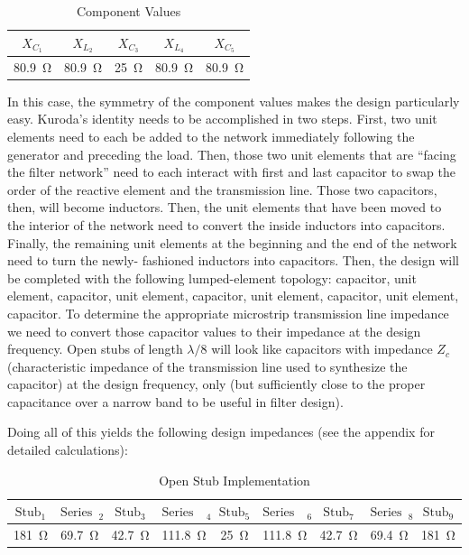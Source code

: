     \begin{table}[H]
        \centering
        \caption{Component Values}
        \label{tab:1a_comp_ractances}
        \begin{tabular}{|c|c|c|c|c|}
            \hline $X_{C_1}$ & $X_{L_2}$  & $X_{C_3}$ & $X_{L_4}$ & $X_{C_5}$ \\
            \hline \SI{80.9}{\ohm}  & \SI{80.9}{\ohm} & \SI{25}{\ohm}  &
            \SI{80.9}{\ohm}  & \SI{80.9}{\ohm} \\
            \hline
        \end{tabular}
    \end{table}

    In this case, the symmetry of the component values makes the design
    particularly easy. Kuroda's identity needs to be accomplished in two steps.
    First, two unit elements need to each be added to the network immediately
    following the generator and preceding the load. Then, those two unit
    elements that are ``facing the filter network'' need to each interact with
    first and last capacitor to swap the order of the reactive element and the
    transmission line. Those two capacitors, then, will become inductors. Then,
    the unit elements that have been moved to the interior of the network need
    to convert the inside inductors into capacitors. Finally, the remaining unit
    elements at the beginning and the end of the network need to turn the newly-
    fashioned inductors into capacitors. Then, the design will be completed with
    the following lumped-element topology: capacitor, unit element, capacitor,
    unit element, capacitor, unit element, capacitor, unit element, capacitor.
    To determine the appropriate microstrip transmission line impedance we need
    to convert those capacitor values to their impedance at the design
    frequency. Open stubs of length $\lambda/8$ will look like capacitors with
    impedance $Z_c$ (characteristic impedance of the transmission line used to
    synthesize the capacitor) at the design frequency, only (but sufficiently
    close to the proper capacitance over a narrow band to be useful in filter
    design).

    Doing all of this yields the following design impedances (see the appendix
    for detailed calculations):

    \begin{table}[H]
        \centering
        \caption{Open Stub Implementation}
        \label{tab:1a_open_stub_ideal}
        \begin{tabular}{|c|c|c|c|c|c|c|c|c|}
            \hline $ \text{Stub}_1 $ & $ \text{Series TL}_2 $  & $ \text{Stub}_3
            $ & $ \text{Series TL}_4 $ & $ \text{Stub}_5 $ & 
            $ \text{Series TL}_6 $ & $ \text{Stub}_7 $  & $ \text{Series TL}_8 $
                                   & $ \text{Stub}_9 $  \\
            \hline \SI{181}{\ohm} & \SI{69.7}{\ohm} & \SI{42.7}{\ohm} &
            \SI{111.8}{\ohm} & \SI{25}{\ohm} & \SI{111.8}{\ohm} &
            \SI{42.7}{\ohm} & \SI{69.4}{\ohm} & \SI{181}{\ohm} \\
            \hline
        \end{tabular}
    \end{table}
    
